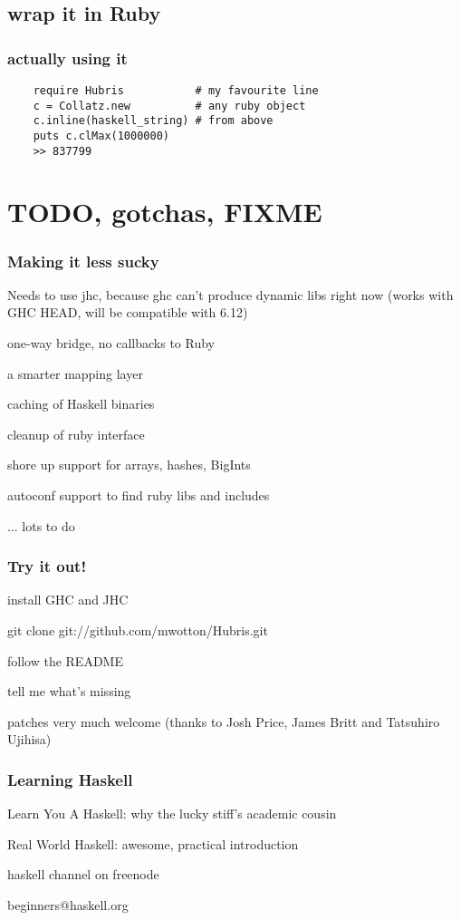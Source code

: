 \documentclass{beamer}
\begin{document}
\subsection{wrap it in Ruby}
\begin{frame}[fragile]
  \frametitle{actually using it}
  \lstset{language=Ruby}
  \begin{lstlisting}
    require Hubris           # my favourite line
    c = Collatz.new          # any ruby object
    c.inline(haskell_string) # from above
    puts c.clMax(1000000)
    >> 837799
  \end{lstlisting}
\end{frame}

\section{TODO, gotchas, FIXME}
\begin{frame}
\setlength\parskip{0.1in}
\frametitle{Making it less sucky}
Needs to use jhc, because ghc can't produce dynamic libs right now
(works with GHC HEAD, will be compatible with 6.12)

one-way bridge, no callbacks to Ruby

a smarter mapping layer

caching of Haskell binaries

cleanup of ruby interface

shore up support for arrays, hashes, BigInts

autoconf support to find ruby libs and includes

... lots to do
\end{frame}


\begin{frame}
\frametitle{Try it out!}
  install GHC and JHC

  git clone git://github.com/mwotton/Hubris.git

  follow the README

  tell me what's missing

  patches very much welcome (thanks to Josh Price, James Britt and Tatsuhiro Ujihisa)
\end{frame}


\begin{frame}
  \frametitle{Learning Haskell}
  Learn You A Haskell: why the lucky stiff's academic cousin

  Real World Haskell: awesome, practical introduction

  haskell channel on freenode

  beginners@haskell.org
\end{frame}
\end{document}

